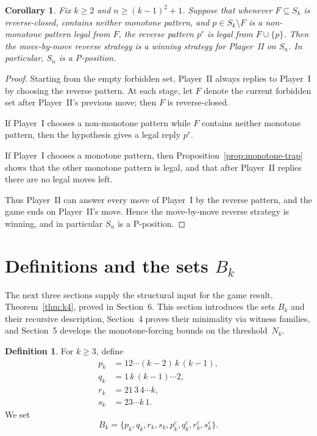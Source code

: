 \documentclass[11pt]{amsart}
\newcommand{\Sym}{S}
\theoremstyle{plain}
\newtheorem{corollary}[theorem]{Corollary}
\theoremstyle{definition}
\newtheorem{definition}[theorem]{Definition}
\theoremstyle{remark}
\begin{document}
\begin{corollary}\label{cor:conditional-reverse}
  Fix $k \geq 2$ and $n \geq (k-1)^2+1$.  Suppose that whenever $F \subseteq \Sym_k$ is reverse-closed,
  contains neither monotone pattern, and $p \in \Sym_k \setminus F$ is a non-monotone pattern legal
  from $F$, the reverse pattern $p^r$ is legal from $F \cup \{p\}$.  Then the move-by-move reverse
  strategy is a winning strategy for Player~II on $\Sym_n$.  In particular, $\Sym_n$ is a P-position.
\end{corollary}

\begin{proof}
  Starting from the empty forbidden set, Player~II always replies to Player~I by choosing the reverse
  pattern.  At each stage, let $F$ denote the current forbidden set after Player~II's previous move;
  then $F$ is reverse-closed.

  If Player~I chooses a non-monotone pattern while $F$ contains neither monotone pattern, then the
  hypothesis gives a legal reply $p^r$.

  If Player~I chooses a monotone pattern, then Proposition~\ref{prop:monotone-trap} shows that the
  other monotone pattern is legal, and that after Player~II replies there are no legal moves left.

  Thus Player~II can answer every move of Player~I by the reverse pattern, and the game ends on
  Player~II's move.  Hence the move-by-move reverse strategy is winning, and in particular
  $\Sym_n$ is a P-position.
\end{proof}

\section{Definitions and the sets \texorpdfstring{$B_k$}{Bk}}

The next three sections supply the structural input for the game result, Theorem~\ref{thm:k4}, proved in Section~6.
This section introduces the sets $B_k$ and their recursive description, Section~4 proves their
minimality via witness families, and Section~5 develops the monotone-forcing bounds on the
threshold~$N_k$.

\begin{definition}
  For $k \geq 3$, define
  \begin{align*}
    p_k & = 12\cdots (k-2)\,k\,(k-1), \\
    q_k & = 1\,k\,(k-1)\cdots 2,      \\
    r_k & = 21\,3\,4\cdots k,         \\
    s_k & = 23\cdots k\,1.
  \end{align*}
  We set
  \[
    B_k=\{p_k,q_k,r_k,s_k,p_k^c,q_k^c,r_k^c,s_k^c\}.
  \]
\end{definition}
\end{document}
